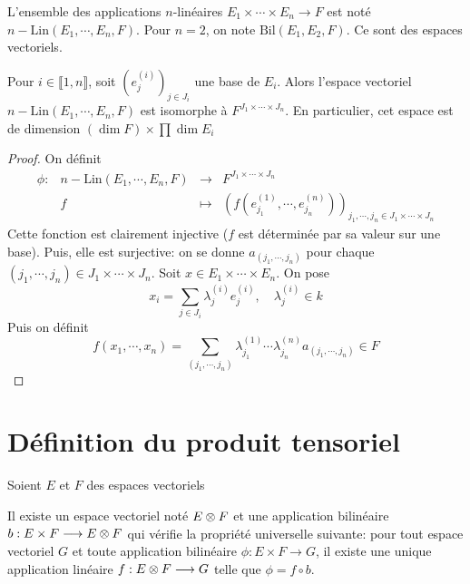\begin{dfn}[Notation]
    L'ensemble des applications $n$-linéaires $E_1\times \cdots \times E_n \longrightarrow F$ est noté $n-\mathrm{Lin}(E_1, \cdots , E_n, F)$. Pour $n=2$, on note  $\mathrm{Bil}(E_1, E_2, F)$. Ce sont des espaces vectoriels.
\end{dfn}

\begin{prop}
    Pour $i \in  \llbracket 1, n \rrbracket $, soit $(e_j^{(i)})_{j \in  J_i}$ une base de $E_i$. Alors l'espace vectoriel $n-\mathrm{Lin}(E_1, \cdots , E_n, F)$ est isomorphe à $F^{J_1\times\cdots \times J_n}$. En particulier, cet espace est de dimension $(\dim F)\times \prod \dim E_i$
\end{prop}

\begin{proof}
On définit \[
\begin{array}{rrcl}
    \phi:& n-\mathrm{Lin}(E_1, \cdots , E_n, F) & \longrightarrow & F^{J_1\times\cdots \times J_n} \\
         & f & \longmapsto & \displaystyle (f(e_{j_1}^{(1)}, \cdots , e_{j_n}^{(n)}))_{j_1, \cdots , j_n \in  J_1\times \cdots \times J_n}
\end{array}
\]
Cette fonction est clairement injective ($f$ est déterminée par sa valeur sur une base). Puis, elle est surjective: on se donne  $a_{(j_1, \cdots , j_n)}$ pour chaque $(j_1, \cdots , j_n) \in  J_1\times \cdots \times J_n$. Soit $x \in  E_1\times \cdots \times E_n$. On pose \[
    x_i=\sum_{j \in  J_i}\lambda_j^{(i)}e_j^{(i)}, \quad  \lambda_j^{(i)} \in  k
\] 
Puis on définit \[
    f(x_1, \cdots , x_n)=\sum_{(j_1, \cdots , j_n)} \lambda_{j_1}^{(1)} \cdots \lambda_{j_n}^{(n)} a_{(j_1, \cdots , j_n)} \in  F
\] 
\end{proof}

\section{Définition du produit tensoriel}

Soient $E$ et  $F$ des espaces vectoriels 

\begin{thm}
Il existe un espace vectoriel noté $E \otimes F$ et une application bilinéaire  $b:E\times F \longrightarrow E\otimes F$ qui vérifie la propriété universelle suivante: pour tout espace vectoriel $G$ et toute application bilinéaire  $\phi:E\times F\longrightarrow G$, il existe une unique application linéaire $f:E\otimes F\longrightarrow G$ telle que $\phi=f\circ b$.

 \begin{center}
\end{center}
\end{thm}

